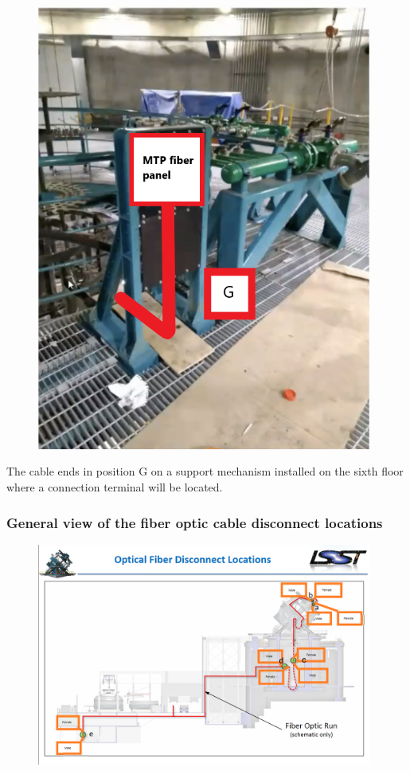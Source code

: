 \begin{figure}
  \includegraphics[width=11cm]{images/21.png}
  \centering
  \label{fig:jlsimon}
\end{figure}

The cable ends in position G on a support mechanism installed on the sixth floor where a connection terminal will be located.


\subsubsection{General view of the fiber optic cable disconnect locations}

\begin{figure}
  \includegraphics[width=11cm]{images/22.png}
  \centering
  \label{fig:jlsimon}
\end{figure}


